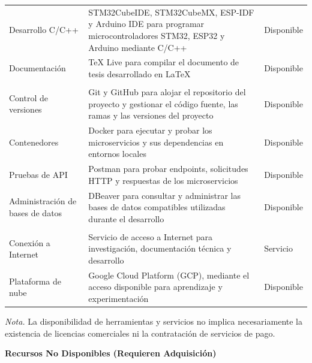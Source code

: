 \documentclass[12pt,a4paper]{article}
\begin{document}
\begin{longtable}{@{} p{} p{} p{} @{}}
	Desarrollo C/C++ &
	STM32CubeIDE, STM32CubeMX, ESP-IDF y Arduino IDE para programar microcontroladores STM32, ESP32 y Arduino mediante C/C++ &
	Disponible \\
	
	Documentación &
	TeX Live para compilar el documento de tesis desarrollado en LaTeX &
	Disponible \\
	\addlinespace
	
	\multicolumn{3}{l}{\textbf{Herramientas de desarrollo y pruebas}} \\
	\midrule
	Control de versiones &
	Git y GitHub para alojar el repositorio del proyecto y gestionar el código fuente, las ramas y las versiones del proyecto &
	Disponible \\
	
	Contenedores &
	Docker para ejecutar y probar los microservicios y sus dependencias en entornos locales &
	Disponible \\
	
	Pruebas de API &
	Postman para probar endpoints, solicitudes HTTP y respuestas de los microservicios &
	Disponible \\
	
	Administración de bases de datos &
	DBeaver para consultar y administrar las bases de datos compatibles utilizadas durante el desarrollo &
	Disponible \\
	\addlinespace
	
	\multicolumn{3}{l}{\textbf{Conectividad y servicios digitales}} \\
	\midrule
	Conexión a Internet &
	Servicio de acceso a Internet para investigación, documentación técnica y desarrollo &
	Servicio \\
	
	Plataforma de nube &
	Google Cloud Platform (GCP), mediante el acceso disponible para aprendizaje y experimentación &
	Disponible \\
	
\end{longtable}
\endgroup

\vspace{0.2cm}

\noindent\parbox{\textwidth}{
	\setlength{\parindent}{0pt}
	\small
	\textit{Nota.} La disponibilidad de herramientas y servicios no implica necesariamente la existencia de licencias comerciales ni la contratación de servicios de pago.
}

\vspace{0.3cm}
\noindent\textbf{Recursos No Disponibles (Requieren Adquisición)}
\end{document}
